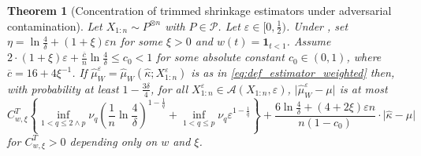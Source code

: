 \documentclass{article}
\theoremstyle{plain}
\newtheorem{theorem}{Theorem}[section]
\theoremstyle{definition}
\def\eps{\varepsilon}
\def\sA{\mathcal{A}}
\def\sP{\mathcal{P}}\def\sQ{\mathcal{Q}}\def\sR{\mathcal{R}}
\begin{document}
\begin{appendix}
\begin{theorem}[Concentration of trimmed shrinkage estimators under adversarial contamination]\label{thm:trimmed_concentration_adv}
  Let $X_{1:n}\sim P^{\otimes n}$ with $P\in\sP$. Let \( \eps \in [0,\frac{1}{2}) \). Under , set $\eta = \ln\frac{4}{\delta}+(1+\xi )\eps n $ for some \( \xi>0 \) and \( w(t)=\mathbf{1}_{t<1} \). Assume \( 2\cdot(1+\xi)\eps + \frac{\overline{c}}{n}\ln \frac{4}{\delta } \le c_0< 1 \) for some absolute constant \( c_0 \in (0,1) \), where \( \overline{c}=16+4\xi^{-1} \). If $\widehat{\mu}_W^\eps  =  \widehat{\mu}_W(\widehat{\kappa };X_{1:n}^\eps) $ is as in \eqref{eq:def_estimator_weighted} then, with probability at least $1-\frac{3\delta}{4}$, for all \( X_{1:n}^\varepsilon \in \sA(X_{1:n},\varepsilon ) \), \( \lvert \widehat{\mu }_W^\varepsilon -\mu   \rvert  \) is at most  
	\begin{equation}\label{eq:conclusion_concentration_trimmed}
    C^T_{w,\xi }\left\{\inf_{1<q\le 2\wedge p} \nu _q \left(\frac{1}{n }\ln \frac{4}{\delta }\right)^{1-\frac{1}{q}}+\inf_{1<q\le p} \nu _q \varepsilon ^{1-\frac{1}{q}}\right\} +\frac{6 \ln \frac{4}{\delta } + (4+2\xi )\varepsilon n}{n(1-c_0)}\cdot \lvert \widehat{\kappa } -\mu  \rvert 
	\end{equation}
  for $C^T_{w,\xi}>0$ depending only on $w$ and \( \xi  \).



\end{theorem}
\end{appendix}
\end{document}
